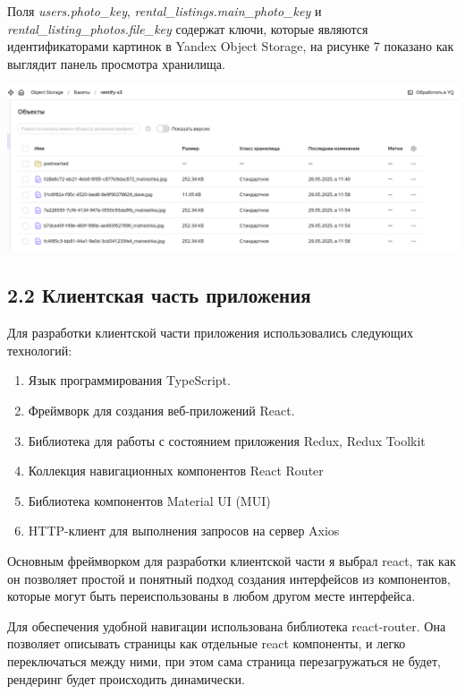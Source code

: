 \documentclass[14pt]{extarticle}
\begin{document}
Поля \textit{users.photo\_key}, \textit{rental\_listings.main\_photo\_key} и
\textit{rental\_listing\_photos.file\_key} содержат ключи, которые являются
идентификаторами картинок в Yandex Object Storage, на рисунке 7 показано как выглядит панель просмотра хранилища.

\begin{center}
    \includegraphics[width=1.0\textwidth]{ys3.png}
\end{center}


\subsection{2.2 Клиентская часть приложения}

\bigskip

Для разработки клиентской части приложения использовались
следующих технологий:
\begin{enumerate}
    \item Язык программирования TypeScript.
    \item Фреймворк для создания веб-приложений React.
    \item Библиотека для работы с состоянием приложения Redux, Redux Toolkit
    \item Коллекция навигационных компонентов React Router
    \item Библиотека компонентов Material UI (MUI)
    \item HTTP-клиент для выполнения запросов на сервер Axios
\end{enumerate}

Основным фреймворком для разработки клиентской части я выбрал react,
так как он позволяет простой и понятный подход создания интерфейсов из компонентов,
которые могут быть переиспользованы в любом другом месте интерфейса.

\bigskip

Для обеспечения удобной навигации использована библиотека react-router.
Она позволяет описывать страницы как отдельные react компоненты,
и легко переключаться между ними, при этом сама страница перезагружаться не будет,
рендеринг будет происходить динамически.
\end{document}

